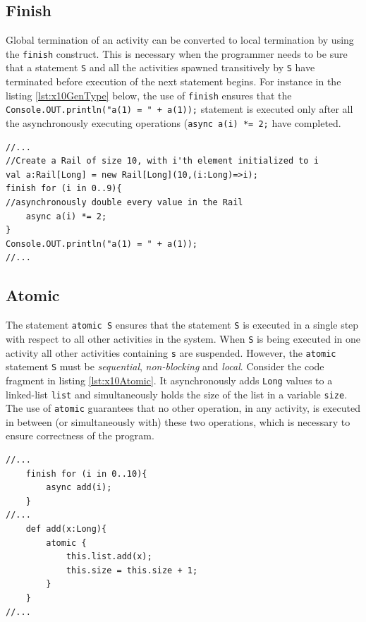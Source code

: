 \subsection{Finish} Global termination of an activity can be converted to local
termination by using the \texttt{finish} construct. This is necessary when the
programmer needs to be sure that a statement \texttt{S} and all the activities
spawned transitively by \texttt{S} have terminated before execution of the next
statement begins. For instance in the listing \ref{lst:x10GenType} below, the use of
\texttt{finish} ensures that the \texttt{Console.OUT.println("a(1) = " + a(1));}
statement is executed only after all the asynchronously executing operations
(\texttt{async a(i) *= 2;} have completed.

\begin{lstlisting}[caption={Example use of \texttt{finish} construct},label={lst:x10GenType},language=x10,numbers=none]
//...
//Create a Rail of size 10, with i'th element initialized to i 
val a:Rail[Long] = new Rail[Long](10,(i:Long)=>i);
finish for (i in 0..9){
//asynchronously double every value in the Rail
	async a(i) *= 2;
}
Console.OUT.println("a(1) = " + a(1));
//...
\end{lstlisting}

\subsection{Atomic} The statement \texttt{atomic S} ensures that the statement \texttt{S} is
executed in a single step with respect to all other activities in the system.
When \texttt{S} is being executed in one activity all other activities
containing \texttt{s} are suspended. However, the \texttt{atomic} statement 
\texttt{S} must be 
\emph{sequential}, \emph{non-blocking} and \emph{local}. Consider the code
fragment in listing \ref{lst:x10Atomic}. It asynchronously adds \texttt{Long}
values to a linked-list \texttt{list} and simultaneously holds the size of the
list in a variable \texttt{size}. The use of \texttt{atomic} guarantees that no
other operation, in any activity, is executed in between (or simultaneously
with) these two operations, which is necessary to ensure correctness of the
program.

\begin{lstlisting}[caption={Example use of \texttt{atomic}
construct},label={lst:x10Atomic},language=x10,numbers=none]
//...
	finish for (i in 0..10){
		async add(i);
	}
//...
	def add(x:Long){
		atomic {
			this.list.add(x);
			this.size = this.size + 1;
		}
	}
//...
\end{lstlisting}

